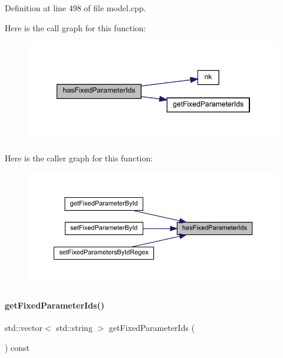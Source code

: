 Definition at line 498 of file model.\+cpp.

Here is the call graph for this function\+:
\nopagebreak
\begin{figure}[H]
\begin{center}
\leavevmode
\includegraphics[width=347pt]{classamici_1_1_model_af50d86316e6930bc98e82afc3893e2ff_cgraph}
\end{center}
\end{figure}
Here is the caller graph for this function\+:
\nopagebreak
\begin{figure}[H]
\begin{center}
\leavevmode
\includegraphics[width=350pt]{classamici_1_1_model_af50d86316e6930bc98e82afc3893e2ff_icgraph}
\end{center}
\end{figure}
\mbox{\label{classamici_1_1_model_aa9278a175bc86b5b020df35dd2581734}} 
\paragraph{\texorpdfstring{getFixedParameterIds()}{getFixedParameterIds()}}
{\footnotesize\ttfamily std\+::vector$<$ std\+::string $>$ get\+Fixed\+Parameter\+Ids (\begin{DoxyParamCaption}{ }\end{DoxyParamCaption}) const\hspace{0.3cm}{\ttfamily [virtual]}}

